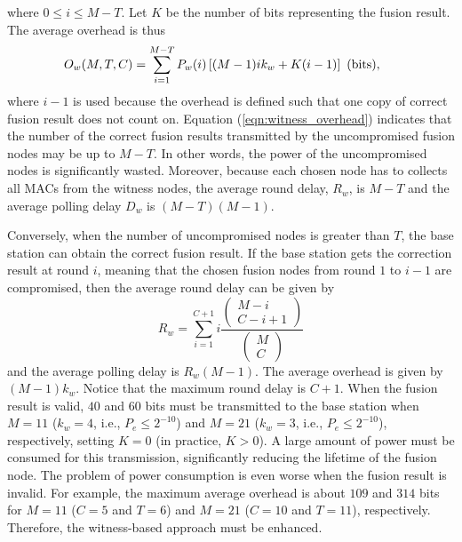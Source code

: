 \documentclass[12pt, onecolumn, draftcls]{IEEEtran}
\begin{document}
\setlength{\arraycolsep}{5pt} where $0 \le i \le M-T$. Let $K$ be
the number of bits representing the fusion result. The average
overhead is thus
\begin{eqnarray}
\hspace{-0.2in} O_w(M,T,C) =  \sum_{i=1}^{M-T} P_w(i) \left[ (M-1)i
k_w + K(i-1) \right]  \mbox{ (bits)}, \label{eqn:witness_overhead}
\end{eqnarray}
where $i-1$ is used because the overhead is defined such that one
copy of correct fusion result does not count on. Equation
(\ref{eqn:witness_overhead}) indicates that the number of the
correct fusion results transmitted by the uncompromised fusion nodes
may be up to $M-T$. In other words, the power of the uncompromised
nodes is significantly wasted. Moreover, because each chosen node
has to collects all MACs from the witness nodes, the average round
delay, $R_w$, is $M-T$ and the average polling delay $D_w$ is
$(M-T)(M-1)$.

Conversely, when the number of uncompromised nodes is greater than
$T$, the base station can obtain the correct fusion result. If the
base station gets the correction result at round $i$, meaning that
the chosen fusion nodes from round $1$ to $i-1$ are compromised,
then the average round delay can be given by
\[
R_w = \sum_{i=1}^{C+1}i\frac{{\left(\begin{array}{c} M-i \\ C-i+1
\end{array}\right)}}{{\left(\begin{array}{c} M \\ C
\end{array}\right)}}
\]
and the average polling delay is $R_w(M-1)$. The average overhead is
given by $(M-1)k_w$. Notice that the maximum round delay is $C+1$.
When the fusion result is valid, $40$ and $60$ bits must be
transmitted to the base station when $M=11$ ($k_w = 4$, i.e., $P_e
\le 2^{-10}$) and $M=21$ ($k_w = 3$, i.e., $P_e \le 2^{-10}$),
respectively, setting $K=0$ (in practice, $K>0$). A large amount of
power must be consumed for this transmission, significantly reducing
the lifetime of the fusion node. The problem of power consumption is
even worse when the fusion result is invalid. For example, the
maximum average overhead is about $109$ and $314$ bits for $M=11$
($C=5$ and $T=6$) and $M=21$ ($C=10$ and $T=11$), respectively.
Therefore, the witness-based approach must be enhanced.
\end{document}
